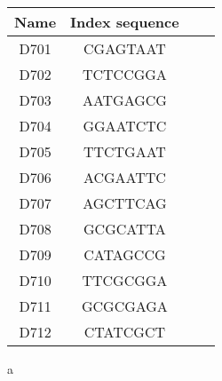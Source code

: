 \begin{center}
\begin{threeparttable}
\begin{tabular}{cccc}\toprule
\textbf{Name} & \textbf{Index sequence}\tnote{a}\\\midrule
D701 & CGAGTAAT\\
D702 & TCTCCGGA\\
D703 & AATGAGCG\\
D704 & GGAATCTC\\
D705 & TTCTGAAT\\
D706 & ACGAATTC\\
D707 & AGCTTCAG\\
D708 & GCGCATTA\\
D709 & CATAGCCG\\
D710 & TTCGCGGA\\
D711 & GCGCGAGA\\
D712 & CTATCGCT\\
\bottomrule
\end{tabular}
\begin{tablenotes}
\item[a] \parencite{illumina2018adapters}
\end{tablenotes}
\end{threeparttable}
\end{center}
